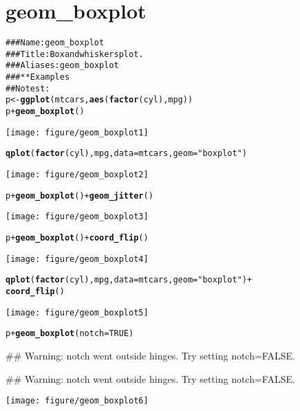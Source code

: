 \documentclass[a4paper,titlepage]{tufte-handout}\usepackage{graphicx, color}
\makeatletter
\def\maxwidth{ %
  \ifdim\Gin@nat@width>\linewidth
    \linewidth
  \else
    \Gin@nat@width
  \fi
}
\newcommand{\hlfunctioncall}[1]{\textcolor[rgb]{0.501960784313725,0,0.329411764705882}{\textbf{#1}}}%
\newcommand{\hlstring}[1]{\textcolor[rgb]{0.6,0.6,1}{#1}}%
\newcommand{\hlcomment}[1]{\textcolor[rgb]{0.180392156862745,0.6,0.341176470588235}{#1}}%
\newenvironment{kframe}{%
 \def\at@end@of@kframe{}%
 \ifinner\ifhmode%
  \def\at@end@of@kframe{\end{minipage}}%
  \begin{minipage}{\columnwidth}%
 \fi\fi%
 \def\FrameCommand##1{\hskip\@totalleftmargin \hskip-\fboxsep
 \colorbox{shadecolor}{##1}\hskip-\fboxsep
     \hskip-\linewidth \hskip-\@totalleftmargin \hskip\columnwidth}%
 \MakeFramed {\advance\hsize-\width
   \@totalleftmargin\z@ \linewidth\hsize
   \@setminipage}}%
 {\par\unskip\endMakeFramed%
 \at@end@of@kframe}
\newenvironment{knitrout}{}{} %
\makeatother
\begin{document}
\section{geom\_boxplot}

\begin{knitrout}
\color{fgcolor}\begin{kframe}
\begin{alltt}
\hlcomment{### Name: geom_boxplot}
\hlcomment{### Title: Box and whiskers plot.}
\hlcomment{### Aliases: geom_boxplot}
\hlcomment{### ** Examples}
\hlcomment{## No test: }
p <- \hlfunctioncall{ggplot}(mtcars, \hlfunctioncall{aes}(\hlfunctioncall{factor}(cyl), mpg))
p + \hlfunctioncall{geom_boxplot}()
\end{alltt}
\end{kframe}\texttt{[image: figure/geom\_boxplot1]} \begin{kframe}\begin{alltt}
\hlfunctioncall{qplot}(\hlfunctioncall{factor}(cyl), mpg, data = mtcars, geom = \hlstring{"boxplot"})
\end{alltt}
\end{kframe}\texttt{[image: figure/geom\_boxplot2]} \begin{kframe}\begin{alltt}
p + \hlfunctioncall{geom_boxplot}() + \hlfunctioncall{geom_jitter}()
\end{alltt}
\end{kframe}\texttt{[image: figure/geom\_boxplot3]} \begin{kframe}\begin{alltt}
p + \hlfunctioncall{geom_boxplot}() + \hlfunctioncall{coord_flip}()
\end{alltt}
\end{kframe}\texttt{[image: figure/geom\_boxplot4]} \begin{kframe}\begin{alltt}
\hlfunctioncall{qplot}(\hlfunctioncall{factor}(cyl), mpg, data = mtcars, geom = \hlstring{"boxplot"}) +
  \hlfunctioncall{coord_flip}()
\end{alltt}
\end{kframe}\texttt{[image: figure/geom\_boxplot5]} \begin{kframe}\begin{alltt}
p + \hlfunctioncall{geom_boxplot}(notch = TRUE)
\end{alltt}
\begin{flushleft}\ttfamily\noindent\textcolor{warningcolor}{\#\# Warning: notch went outside hinges. Try setting notch=FALSE.}\end{flushleft}\begin{flushleft}\ttfamily\noindent\textcolor{warningcolor}{\#\# Warning: notch went outside hinges. Try setting notch=FALSE.}\end{flushleft}\end{kframe}\texttt{[image: figure/geom\_boxplot6]} \begin{kframe}\begin{alltt}

\end{alltt}
\end{kframe}
\end{knitrout}
\end{document}
